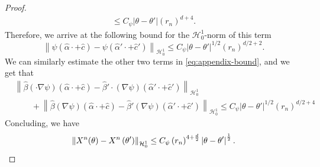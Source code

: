 \documentclass[10pt,a4paper]{amsart}
\newcommand{\abs}[1]{\left|#1\right|} %
\newcommand{\cH}{\mathcal{H}}
\newcommand{\norm}[1]{\left\|#1 \right\|} %
\begin{document}
\begin{proof}
\begin{multline*}
     \le  C_\psi \abs{\theta-\theta'}(r_n)^{d+4}.
\end{multline*}
Therefore, we arrive at the following bound for the $\cH_0^1$-norm of this term
\[
    \norm{\psi \left( \hat\alpha \cdot + \hat c \right)-\psi \left( \hat\alpha' \cdot + \hat c'\right)}_{\cH_0^1}\le C_\psi \abs{\theta-\theta'}^{1/2}(r_n)^{d/2+2}.
\]
We can similarly estimate the other two terms in \eqref{eq:appendix-bound}, and we get that
\begin{align*}
&\norm{\hat\beta  \left( \cdot\nabla \psi \right) \left( \hat\alpha \cdot + \hat c \right)-\hat\beta' \cdot \left( \nabla \psi \right) \left( \hat\alpha' \cdot + \hat c' \right)}_{\cH_0^1} \\
    &\qquad + \norm{\hat\beta \left( \nabla \psi \right) \left( \hat\alpha \cdot + \hat c \right)-\hat\beta' \left( \nabla \psi \right) \left( \hat\alpha' \cdot + \hat c' \right)}_{\cH_0^1} 
    \le  C_\psi \abs{\theta-\theta'}^{1/2}(r_n)^{d/2+4}
\end{align*}
Concluding, we have
\[
    \norm{X^n(\theta) - X^n\left( \theta'\right)}_{\cH_0^1} \le C_\psi \left(r_n\right)^{4+\frac{d}{2}}\abs{\theta-\theta'}^{\frac{1}{2}}. \qedhere
\]
\end{proof}
\end{document}

